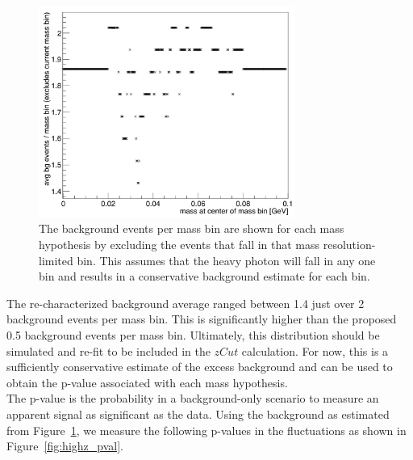 \begin{figure}[htb]
  \centering
      \includegraphics[width=0.75\textwidth]{pics/results/highz_avgBG.png}
  \caption[Re-characterization of the excess background]{The background events per mass bin are shown for each mass hypothesis by excluding the events that fall in that mass resolution-limited bin. This assumes that the heavy photon will fall in any one bin and results in a conservative background estimate for each bin.}
  \label{fig:highz_newbg}
\end{figure} 

The re-characterized background average ranged between 1.4 just over 2 background events per mass bin. This is significantly higher than the proposed 0.5 background events per mass bin. Ultimately, this distribution should be simulated and re-fit to be included in the $zCut$ calculation. For now, this is a sufficiently conservative estimate of the excess background and can be used to obtain the p-value associated with each mass hypothesis. \\
\indent The p-value is the probability in a background-only scenario to measure an apparent signal as significant as the data. Using the background as estimated from Figure~\ref{fig:highz_newbg}, we measure the following p-values in the fluctuations as shown in Figure~\ref{fig:highz_pval}.

